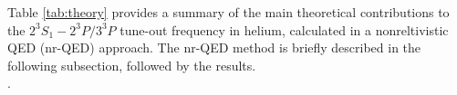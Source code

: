 \documentclass[%
 amsmath,amssymb,
aps,
]{revtex4-2}
\newcommand{\MetastableState}{2^{3\!}S_1}%
\newcommand{\UpperStateManifold}{3^{3\!}P}%
\newcommand{\LowerStateManifold}{2^{3\!}P}%
\newcommand{\TO}{\MetastableState- \LowerStateManifold / \UpperStateManifold}%
\begin{document}


Table \ref{tab:theory} provides a summary of the main theoretical contributions to the \(\TO\) tune-out frequency in helium, calculated in a nonreltivistic QED (nr-QED) approach. The nr-QED method is briefly described in the following subsection, followed by the results.\\[\baselineskip].
\end{document}
